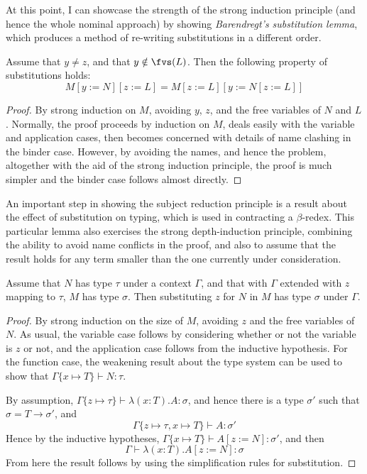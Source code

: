 At this point, I can showcase the strength of the strong induction principle (and hence the whole nominal approach) by showing \emph{Barendregt's substitution lemma}, which produces a method of re-writing substitutions in a different order.

\begin{lemma}
Assume that \(y \neq z\), and that \(y \notin \fvs(L)\).
Then the following property of substitutions holds:
\[
M[y := N][z := L] = M[z := L][y := N[z := L]]
\]
\end{lemma}
\begin{proof}
By strong induction on \(M\), avoiding \(y\), \(z\), and the free variables of \(N\) and \(L\).
Normally, the proof proceeds by induction on \(M\), deals easily with the variable and application cases, then becomes concerned with details of name clashing in the binder case.
However, by avoiding the names, and hence the problem, altogether with the aid of the strong induction principle, the proof is much simpler and the binder case follows almost directly.
\end{proof}

An important step in showing the subject reduction principle is a result about the effect of substitution on typing, which is used in contracting a \(\beta\)-redex.
This particular lemma also exercises the strong depth-induction principle, combining the ability to avoid name conflicts in the proof, and also to assume that the result holds for any term smaller than the one currently under consideration.

\begin{lemma}
\label{lemma:typing-subst}
Assume that \(N\) has type \(\tau\) under a context \(\Gamma\), and that with \(\Gamma\) extended with \(z\) mapping to \(\tau\), \(M\) has type \(\sigma\).
Then substituting \(z\) for \(N\) in \(M\) has type \(\sigma\) under \(\Gamma\).
\end{lemma}
\begin{proof}
By strong induction on the size of \(M\), avoiding \(z\) and the free variables of \(N\).
As usual, the variable case follows by considering whether or not the variable is \(z\) or not, and the application case follows from the inductive hypothesis.
For the function case, the weakening result about the type system can be used to show that \(\Gamma\{x \mapsto T\} \vdash N : \tau\).

By assumption, \(\Gamma\{z \mapsto \tau\} \vdash \lambda (x:T).A : \sigma\), and hence there is a type \(\sigma'\) such that \(\sigma = T \to \sigma'\), and
\[
\Gamma\{z \mapsto \tau, x \mapsto T\} \vdash A : \sigma'
\]
Hence by the inductive hypotheses, \(\Gamma\{x \mapsto T\} \vdash A[z := N] : \sigma'\), and then
\[
\Gamma \vdash \lambda (x:T). A[z := N] : \sigma
\]
From here the result follows by using the simplification rules for substitution.
\end{proof}

